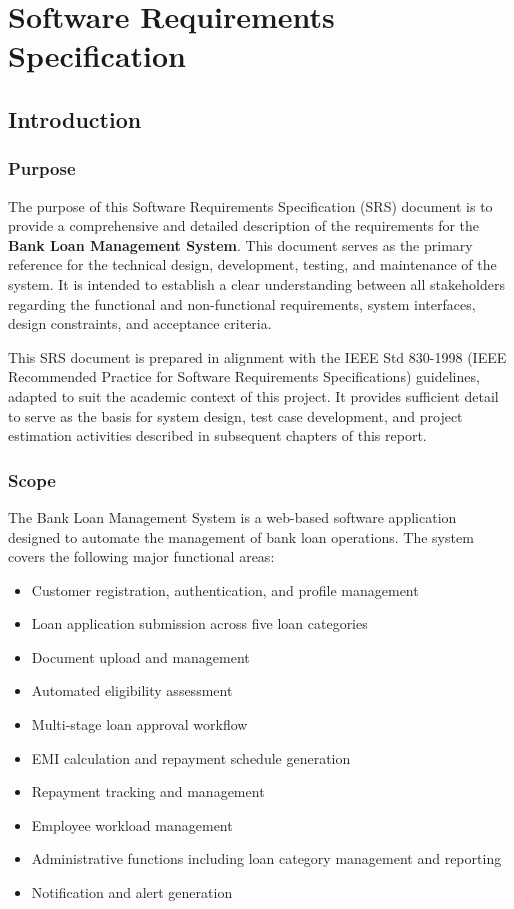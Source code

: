 \documentclass[12pt,a4paper,oneside]{report}
\begin{document}
\chapter{Software Requirements Specification}

\section{Introduction}

\subsection{Purpose}

The purpose of this Software Requirements Specification (SRS) document is to provide a comprehensive and detailed description of the requirements for the \textbf{Bank Loan Management System}. This document serves as the primary reference for the technical design, development, testing, and maintenance of the system. It is intended to establish a clear understanding between all stakeholders regarding the functional and non-functional requirements, system interfaces, design constraints, and acceptance criteria.

This SRS document is prepared in alignment with the IEEE Std 830-1998 (IEEE Recommended Practice for Software Requirements Specifications) guidelines, adapted to suit the academic context of this project. It provides sufficient detail to serve as the basis for system design, test case development, and project estimation activities described in subsequent chapters of this report.

\subsection{Scope}

The Bank Loan Management System is a web-based software application designed to automate the management of bank loan operations. The system covers the following major functional areas:

\begin{itemize}
  \item Customer registration, authentication, and profile management
  \item Loan application submission across five loan categories
  \item Document upload and management
  \item Automated eligibility assessment
  \item Multi-stage loan approval workflow
  \item EMI calculation and repayment schedule generation
  \item Repayment tracking and management
  \item Employee workload management
  \item Administrative functions including loan category management and reporting
  \item Notification and alert generation
\end{itemize}
\end{document}
